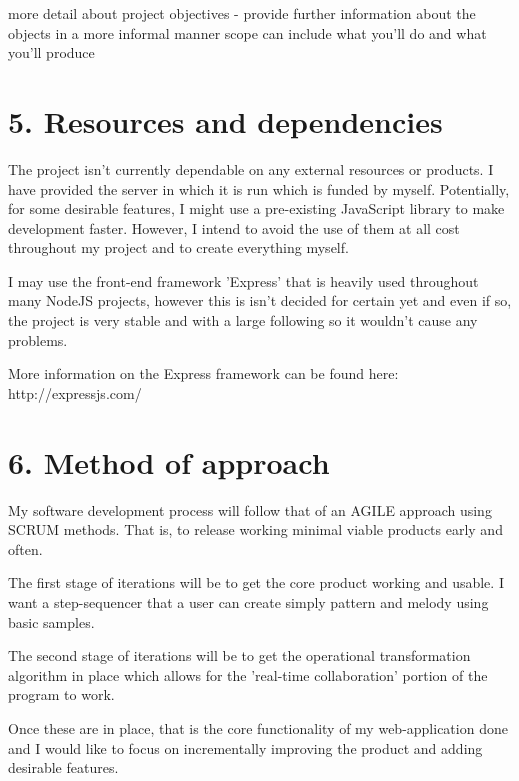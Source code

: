 \documentclass[a4paper]{article}
\begin{document}
more detail about project objectives
- provide further information about the objects in a more informal manner
scope can include what you'll do and what you'll produce

\section{5. Resources and dependencies}

The project isn't currently dependable on any external resources or products. I have provided the server in which it is run which is funded by myself. Potentially, for some desirable features, I might use a pre-existing JavaScript library to make development faster. However, I intend to avoid the use of them at all cost throughout my project and to create everything myself.

I may use the front-end framework 'Express' that is heavily used throughout many NodeJS projects, however this is isn't decided for certain yet and even if so, the project is very stable and with a large following so it wouldn't cause any problems.

More information on the Express framework can be found here: http://expressjs.com/

\section{6. Method of approach}

My software development process will follow that of an AGILE approach using SCRUM methods. That is, to release working minimal viable products early and often. 

The first stage of iterations will be to get the core product working and usable. I want a step-sequencer that a user can create simply pattern and melody using basic samples.

The second stage of iterations will be to get the operational transformation algorithm in place which allows for the 'real-time collaboration' portion of the program to work.

Once these are in place, that is the core functionality of my web-application done and I would like to focus on incrementally improving the product and adding desirable features.
\end{document}
